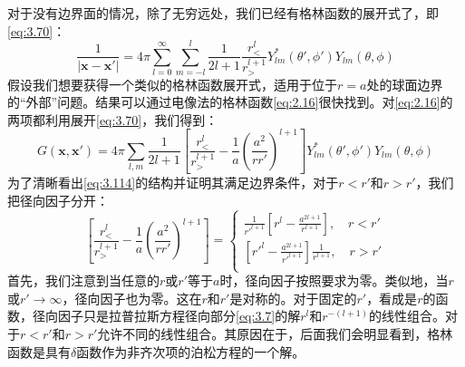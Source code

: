 \documentclass[12pt]{book}
\numberwithin{equation}{chapter}
\numberwithin{figure}{chapter}
\numberwithin{footnote}{page}
\begin{document}
对于没有边界面的情况，除了无穷远处，我们已经有格林函数的展开式了，即\autoref{eq:3.70}：
$$\frac{1}{|\mathbf{x}-\mathbf{x'}|}=4\pi \sum_{l=0}^\infty\sum_{m=-l}^l\frac{1}{2l+1}\frac{r_<^l}{r_>^{l+1}}Y_{lm}^*(\theta',\phi')Y_{lm}(\theta,\phi)$$
假设我们想要获得一个类似的格林函数展开式，适用于位于$r=a$处的球面边界的“外部”问题。结果可以通过电像法的格林函数\autoref{eq:2.16}很快找到。对\autoref{eq:2.16}的两项都利用展开\autoref{eq:3.70}，我们得到：
\begin{equation}\label{eq:3.114}
    G(\mathbf{x},\mathbf{x}')=4\pi\sum_{l,m}\frac{1}{2l+1}[\frac{r_<^l}{r_>^{l+1}}-\frac{1}{a}(\frac{a^2}{rr'})^{l+1}]Y_{lm}^*(\theta',\phi')Y_{lm}(\theta,\phi)
\end{equation}
为了清晰看出\autoref{eq:3.114}的结构并证明其满足边界条件，对于$r<r'$和$r>r'$，我们把径向因子分开：
\begin{equation}\label{eq:3.115}
    [\frac{r_<^l}{r_>^{l+1}}-\frac{1}{a}(\frac{a^2}{rr'})^{l+1}]=
    \begin{cases}
        \frac{1}{r'^{l+1}}[r^l-\frac{a^{2l+1}}{r^{l+1}}],\quad r<r'\\
        [r'^l-\frac{a^{2l+1}}{r'^{l+1}}]\frac{1}{r^{l+1}},\quad r>r'\\
    \end{cases}
\end{equation}
首先，我们注意到当任意的$r$或$r'$等于$a$时，径向因子按照要求为零。类似地，当$r$或$r'\to\infty$，径向因子也为零。这在$r$和$r'$是对称的。对于固定的$r'$，看成是$r$的函数，径向因子只是拉普拉斯方程径向部分\autoref{eq:3.7}的解$r^l$和$r^{-(l+1)}$的线性组合。对于$r<r'$和$r>r'$允许不同的线性组合。其原因在于，后面我们会明显看到，格林函数是具有$\delta$函数作为非齐次项的泊松方程的一个解。
\end{document}
